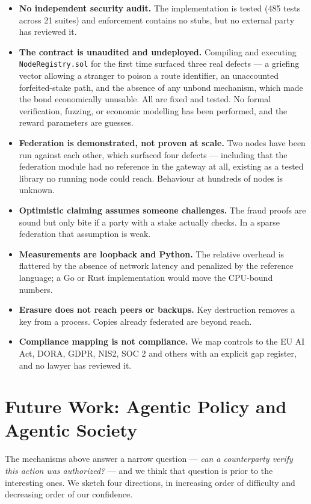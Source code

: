 \documentclass[11pt]{article}
\begin{document}
\begin{itemize}[leftmargin=1.4em,itemsep=0.15em]
\item \textbf{No independent security audit.} The implementation is tested (485
      tests across 21 suites) and enforcement contains no stubs, but no external
      party has reviewed it.
\item \textbf{The contract is unaudited and undeployed.} Compiling and executing
      \texttt{NodeRegistry.sol} for the first time surfaced three real defects
      --- a griefing vector allowing a stranger to poison a route identifier, an
      unaccounted forfeited-stake path, and the absence of any unbond mechanism,
      which made the bond economically unusable. All are fixed and tested. No
      formal verification, fuzzing, or economic modelling has been performed, and
      the reward parameters are guesses.
\item \textbf{Federation is demonstrated, not proven at scale.} Two nodes have
      been run against each other, which surfaced four defects --- including that
      the federation module had no reference in the gateway at all, existing as a
      tested library no running node could reach. Behaviour at hundreds of nodes
      is unknown.
\item \textbf{Optimistic claiming assumes someone challenges.} The fraud proofs
      are sound but only bite if a party with a stake actually checks. In a
      sparse federation that assumption is weak.
\item \textbf{Measurements are loopback and Python.} The relative overhead is
      flattered by the absence of network latency and penalized by the reference
      language; a Go or Rust implementation would move the CPU-bound numbers.
\item \textbf{Erasure does not reach peers or backups.} Key destruction removes a
      key from a process. Copies already federated are beyond reach.
\item \textbf{Compliance mapping is not compliance.} We map controls to the EU AI
      Act, DORA, GDPR, NIS2, SOC 2 and others with an explicit gap register, and
      no lawyer has reviewed it.
\end{itemize}

\section{Future Work: Agentic Policy and Agentic Society}\label{sec:future}

The mechanisms above answer a narrow question --- \emph{can a counterparty verify
this action was authorized?} --- and we think that question is prior to the
interesting ones. We sketch four directions, in increasing order of difficulty
and decreasing order of our confidence.
\end{document}
